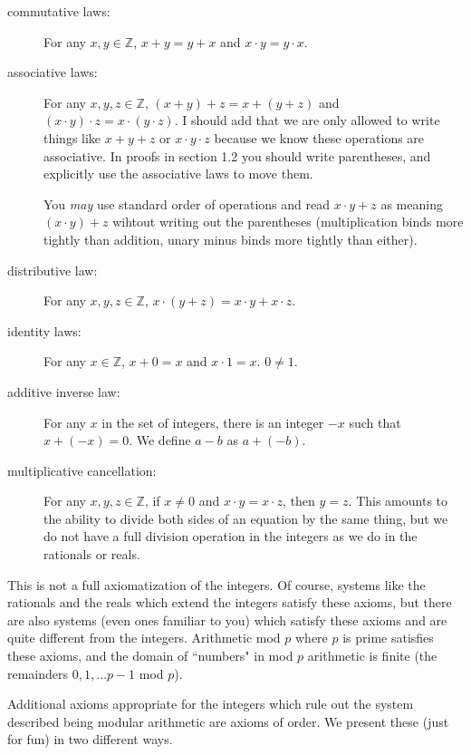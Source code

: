 \documentclass[12pt]{article}
\begin{document}
\begin{description}

\item[commutative laws:]  For any $x,y \in {\mathbb Z}$, $x+y=y+x$ and $x \cdot y = y \cdot x$.

\item[associative laws:]  For any $x,y,z \in {\mathbb Z}$, $(x+y)+z = x+(y+z)$ and $(x \cdot y)\cdot z = x \cdot(y\cdot z)$.  I should add that we are only allowed to write things like $x+y+z$ or $x \cdot y \cdot z$ because we know these operations are associative.  In proofs in section 1.2 you should write parentheses, and explicitly use the associative laws to move them.

You {\em may\/} use standard order of operations and read $x \cdot y + z$ as meaning $(x \cdot y) + z$ wihtout writing out the parentheses (multiplication binds more tightly than addition, unary minus binds more tightly than either).

\item[distributive law:]  For any $x,y,z \in {\mathbb Z}$, $x\cdot(y+z) = x \cdot y + x \cdot z$.

\item[identity laws:]  For any $x \in {\mathbb Z}$, $x+0=x$ and $x \cdot 1 = x$.  $0 \neq 1$.

\item[additive inverse law:]  For any $x$ in the set of integers, there is an integer $-x$ such that $x+(-x)=0$.   We define $a-b$ as $a+(-b)$.

\item[multiplicative cancellation:]  For any $x,y,z \in {\mathbb Z}$, if $x \neq 0$ and $x\cdot y = x\cdot z$, then $y=z$.
This amounts to the ability to divide both sides of an equation by the same thing, but we do not have a full division operation in the integers as we do in the rationals or reals.

\end{description}

This is not a full axiomatization of the integers.  Of course, systems like the rationals and the reals which extend the integers
satisfy these axioms, but there are also systems (even ones familiar to you) which satisfy these axioms and are quite different from the integers.  Arithmetic mod $p$ where $p$ is prime satisfies these axioms, and the domain of ``numbers" in mod $p$ arithmetic is finite (the remainders $0,1,\ldots p-1$ mod $p$).

Additional axioms appropriate for the integers which rule out the system described being modular arithmetic are axioms of order.  We present these (just for fun) in two different ways.
\end{document}
